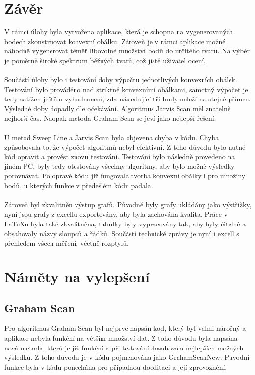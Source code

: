 \documentclass[a4paper, 12pt]{article}
\begin{document}
\clearpage
\section{Závěr}
V rámci úlohy byla vytvořena aplikace, která je schopna na vygenerovaných bodech zkonstruovat konvexní obálku. Zároveň je v rámci aplikace možné náhodně vygenerovat téměř libovolné množství bodů do určitého tvaru. Na výběr je poměrně široké spektrum běžných tvarů, což jistě uživatel ocení.\\
\\
Součástí úlohy bylo i testování doby výpočtu jednotlivých konvexních obálek. Testování bylo prováděno nad striktně konvexními obálkami, samotný výpočet je tedy zatížen ještě o vyhodnocení, zda následující tři body neleží na stejné přímce. Výsledné doby dopadly dle očekávání. Algoritmus Jarvis Scan měl znatelně nejhorší čas. Naopak metoda Graham Scan se jeví jako nejlepší řešení.\\
\\
U metod Sweep Line a Jarvis Scan byla objevena chyba v kódu. Chyba způsobovala to, že výpočet algoritmů nebyl efektivní. Z toho důvodu bylo nutné kód opravit a provést znovu testování. Testování bylo následně provedeno na jiném PC, byly tedy otestovány všechny algoritmy, aby bylo možné výsledky porovnávat. Po opravě kódu již fungovala tvorba konvexní obálky i pro množiny bodů, u kterých funkce v předešlém kódu padala. \\
\\
Zároveň byl zkvalitněn výstup grafů. Původně byly grafy ukládány jako výstřižky, nyní jsou grafy z excellu exportovány, aby byla zachována kvalita. Práce v LaTeXu byla také zkvalitněna, tabulky byly vypracovány tak, aby byly čitelné a obsahovaly názvy sloupců a řádků. Součástí technické zprávy je nyní i excell s přehledem všech měření, včetně rozptylů.

\section{Náměty na vylepšení}
\subsection{Graham Scan}
Pro algoritmus Graham Scan byl nejprve napsán kod, který byl velmi náročný a aplikace nebyla funkční na větším množství dat. Z toho důvodu byla napsána nová metoda, která je již funkční a při testování dosahovala nejlepších možných výsledků. Z toho důvodu je v kódu pojmenována jako GrahamScanNew. Původní funkce byla v kódu ponechána pro případnou doeditaci a její zprovoznění.
\end{document}
